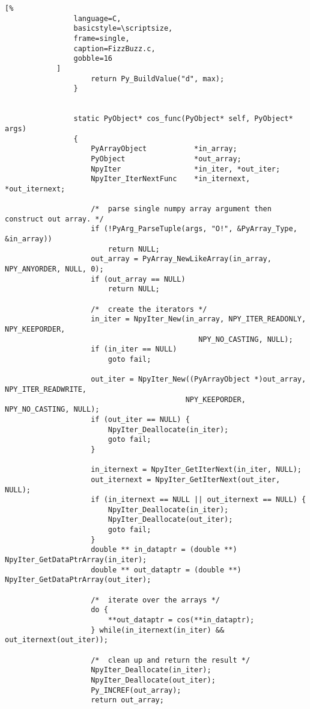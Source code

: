 \documentclass[crop=false,class=book,oneside]{standalone}
\begin{document}
\begin{lstlisting}[%
                language=C,
                basicstyle=\scriptsize,
                frame=single,
                caption=FizzBuzz.c,
                gobble=16
            ]
                    return Py_BuildValue("d", max);
                }


                static PyObject* cos_func(PyObject* self, PyObject* args)
                {
                    PyArrayObject           *in_array;
                    PyObject                *out_array;
                    NpyIter                 *in_iter, *out_iter;
                    NpyIter_IterNextFunc    *in_iternext, *out_iternext;
                
                    /*  parse single numpy array argument then construct out array. */
                    if (!PyArg_ParseTuple(args, "O!", &PyArray_Type, &in_array))
                        return NULL;
                    out_array = PyArray_NewLikeArray(in_array, NPY_ANYORDER, NULL, 0);
                    if (out_array == NULL)
                        return NULL;
                
                    /*  create the iterators */
                    in_iter = NpyIter_New(in_array, NPY_ITER_READONLY, NPY_KEEPORDER,
                                             NPY_NO_CASTING, NULL);
                    if (in_iter == NULL)
                        goto fail;
                
                    out_iter = NpyIter_New((PyArrayObject *)out_array, NPY_ITER_READWRITE,
                                          NPY_KEEPORDER, NPY_NO_CASTING, NULL);
                    if (out_iter == NULL) {
                        NpyIter_Deallocate(in_iter);
                        goto fail;
                    }
                
                    in_iternext = NpyIter_GetIterNext(in_iter, NULL);
                    out_iternext = NpyIter_GetIterNext(out_iter, NULL);
                    if (in_iternext == NULL || out_iternext == NULL) {
                        NpyIter_Deallocate(in_iter);
                        NpyIter_Deallocate(out_iter);
                        goto fail;
                    }
                    double ** in_dataptr = (double **) NpyIter_GetDataPtrArray(in_iter);
                    double ** out_dataptr = (double **) NpyIter_GetDataPtrArray(out_iter);
                
                    /*  iterate over the arrays */
                    do {
                        **out_dataptr = cos(**in_dataptr);
                    } while(in_iternext(in_iter) && out_iternext(out_iter));
                
                    /*  clean up and return the result */
                    NpyIter_Deallocate(in_iter);
                    NpyIter_Deallocate(out_iter);
                    Py_INCREF(out_array);
                    return out_array;
                

\end{lstlisting}
\end{document}
